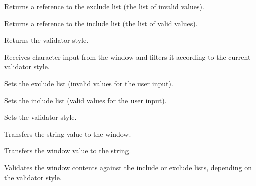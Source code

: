 
Returns a reference to the exclude list (the list of invalid values).

\label{wxtextvalidatorgetincludelist}


Returns a reference to the include list (the list of valid values).

\label{wxtextvalidatorgetstyle}


Returns the validator style.

\label{wxtextvalidatoronchar}


Receives character input from the window and filters it according to the
current validator style.

\label{wxtextvalidatorsetexcludelist}


Sets the exclude list (invalid values for the user input).

\label{wxtextvalidatorsetincludelist}


Sets the include list (valid values for the user input).

\label{wxtextvalidatorsetstyle}


Sets the validator style.

\label{wxtextvalidatortransferfromwindow}


Transfers the string value to the window.

\label{wxtextvalidatortransfertowindow}


Transfers the window value to the string.

\label{wxtextvalidatorvalidate}


Validates the window contents against the include or exclude lists, depending
on the validator style.

